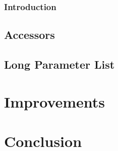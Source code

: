 \documentclass[11pt,a4paper]{article}
\begin{document}
\subsubsection{Introduction} 
\subsection{Accessors}
\subsection{Long Parameter List}
\section{Improvements}
\section{Conclusion}
\end{document}
